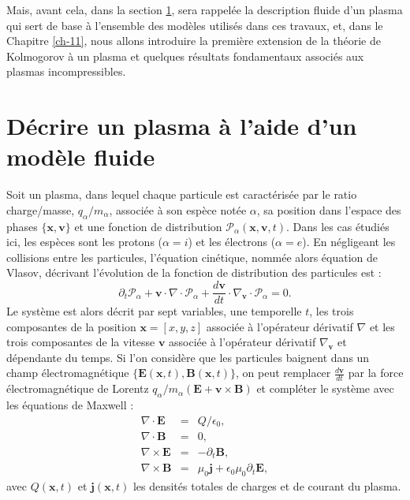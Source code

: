 Mais, avant cela, dans la section \ref{sec-023}, sera rappelée la description fluide d'un plasma qui sert de base à l'ensemble des modèles utilisés dans ces travaux, et, dans le Chapitre \ref{ch-11}, nous allons introduire la première extension de la théorie de Kolmogorov à un plasma et quelques résultats fondamentaux associés aux plasmas incompressibles. 

\section{Décrire un plasma à l'aide d'un modèle fluide} \label{sec-023}

Soit un plasma, dans lequel chaque particule est caractérisée par le ratio charge/masse, $q_{\alpha}/m_{\alpha}$, associée à son espèce notée $\alpha$, sa position dans l'espace des phases $\{\mathbf{x},\mathbf{v}\}$ et une fonction de distribution $\mathcal{P}_{\alpha}\left(\mathbf{x},\mathbf{v},t\right)$. Dans les cas étudiés ici, les espèces sont les protons ($\alpha = i$) et les électrons ($\alpha=e$). En négligeant les collisions entre les particules, l'équation cinétique, nommée alors équation de Vlasov, décrivant l'évolution de la fonction de distribution des particules est : 
\begin{equation}
\partial_t \mathcal{P}_{\alpha} +  \mathbf{v} \cdot \nabla \cdot \mathcal{P}_{\alpha} + \frac{d \mathbf{v}}{d t} \cdot \nabla_{\mathbf{v}}  \cdot  \mathcal{P}_{\alpha}  = 0.
\label{kinetic vlasov}
\end{equation}
Le système est alors décrit par sept variables, une temporelle $t$, les trois composantes de la position $\mathbf{x}=\left[x,y,z\right]$ associée à l'opérateur dérivatif $\nabla$ et les trois composantes de la vitesse $\mathbf{v}$ associée à l'opérateur dérivatif $\nabla_{\mathbf{v}}$ et dépendante du temps. Si l'on considère que les particules baignent dans un champ électromagnétique $\{\boldsymbol{E}\left(\mathbf{x},t\right),\boldsymbol{B}\left(\mathbf{x},t\right)\}$, on peut remplacer $\frac{d \mathbf{v}}{d t}$  par la force électromagnétique de Lorentz $q_{\alpha}/m_{\alpha} \left(\boldsymbol{E} + \mathbf{v} \times \boldsymbol{B}\right)$ et compléter le système avec les équations de Maxwell :
\begin{eqnarray}
    \label{eq:M1}\nabla \cdot \boldsymbol{E} &=& Q/\epsilon_0 ,\\
     \label{eq:M2}\nabla \cdot \boldsymbol{B} &=& 0 ,\\
     \label{eq:M3}\nabla \times \boldsymbol{E} &=& -\partial_t \boldsymbol{B} ,\\
     \label{eq:M4}\nabla \times \boldsymbol{B} &=& \mu_0 \boldsymbol{j} + \epsilon_0 \mu_0 \partial_t \boldsymbol{E} ,
\end{eqnarray}
avec $Q\left(\mathbf{x},t\right)$ et  $\boldsymbol{j}\left(\mathbf{x},t\right)$ les densités totales de charges et de courant du plasma. 

